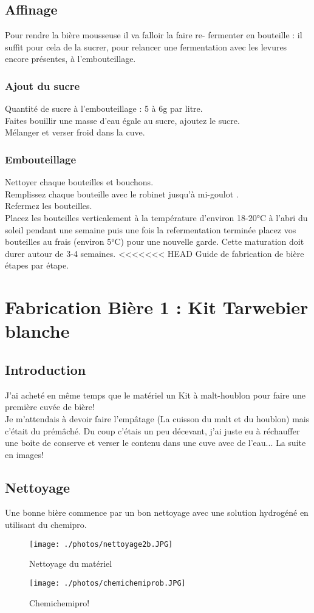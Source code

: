 \documentclass[twoside,twocolumn]{report}
\begin{document}
	 \section{Affinage}
			 Pour rendre la bière mousseuse il va falloir la faire re- fermenter en bouteille : il suffit pour cela	 de la sucrer, pour relancer une fermentation avec les levures encore présentes, à l’embouteillage.
			 \subsection{Ajout du sucre}
				 Quantité de sucre à l’embouteillage : 5 à 6g par litre.\\	 
				 Faites bouillir une  masse d’eau égale au sucre, ajoutez le sucre. \\
				 Mélanger et verser froid dans la cuve.\\
			 \subsection{Embouteillage}
				 Nettoyer chaque bouteilles et bouchons.\\
				 Remplissez chaque bouteille avec le robinet  jusqu’à  mi-goulot .\\
				 Refermez les  bouteilles.\\
				 
				 Placez les bouteilles verticalement à la température d’environ 18-20°C à l'abri du soleil pendant une semaine puis une fois la refermentation terminée placez vos bouteilles au frais (environ 5°C) pour une
				 nouvelle garde. Cette maturation doit durer autour de 3-4 semaines.
<<<<<<< HEAD
	Guide de fabrication de bière étapes par étape.
	\chapter*{Fabrication Bière 1 : Kit Tarwebier blanche}
		\section{Introduction}
			J'ai acheté en même temps que le matériel un Kit à malt-houblon pour faire une première cuvée de bière!\\
			Je m'attendais à devoir faire l'empâtage (La cuisson du malt et du houblon) mais c'était du prémâché. Du coup c'étais un peu décevant, j'ai juste eu à réchauffer une boite de conserve et verser le contenu dans une cuve avec de l'eau... La suite en images!
		\section{Nettoyage}
			Une bonne bière commence par un bon nettoyage avec une solution hydrogéné en utilisant du chemipro.
			\begin{figure}[h!]
				\centering
				\texttt{[image: ./photos/nettoyage2b.JPG]}
				\caption{Nettoyage du matériel}
				\label{netoyage}
			\end{figure}
			\begin{figure}[h!]
				\centering
				\texttt{[image: ./photos/chemichemiprob.JPG]}
				\caption{Chemichemipro!}
				\label{chemi}
			\end{figure}
\end{document}
